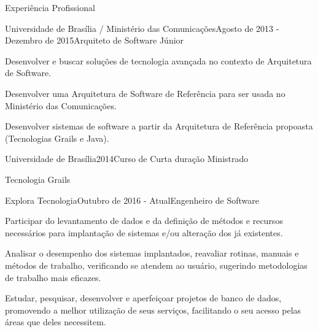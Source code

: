 \documentclass{resume} %
\begin{document}
\begin{rSection}{Experiência Profissional}

\begin{rSubsection}{Universidade de Brasília / Ministério das Comunicações}{Agosto de 2013 - Dezembro de 2015}{Arquiteto de Software Júnior}{}
\item Desenvolver e buscar soluções de tecnologia avançada no contexto de Arquitetura de
Software.
\item Desenvolver uma Arquitetura de Software de Referência para ser usada no Ministério
das Comunicações.
\item Desenvolver sistemas de software a partir da Arquitetura de Referência propoasta (Tecnologias Grails e Java).
\end{rSubsection}


\begin{rSubsection}{Universidade de Brasília}{2014}{Curso de Curta duração Ministrado}{}
\item Tecnologia Grails
\end{rSubsection}


\begin{rSubsection}{Explora Tecnologia}{Outubro de 2016 - Atual}{Engenheiro de Software}{}
\item Participar do levantamento de dados e da definição de métodos e recursos necessários para implantação de sistemas e/ou alteração dos já existentes.
\item Analisar o desempenho dos sistemas implantados, reavaliar rotinas, manuais e métodos de trabalho, verificando se atendem ao usuário, sugerindo metodologias de trabalho mais eficazes.
\item Estudar, pesquisar, desenvolver e aperfeiçoar projetos de banco de dados, promovendo a melhor utilização de seus serviços, facilitando o seu acesso pelas áreas que deles necessitem.
\end{rSubsection}

\end{rSection}

\end{document}
